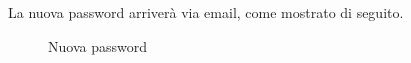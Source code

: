 La nuova password arriverà via email, come mostrato di seguito.

\label{Nuova password}
\begin{figure}[H]
	\centering
	\caption{Nuova password}
\end{figure}



